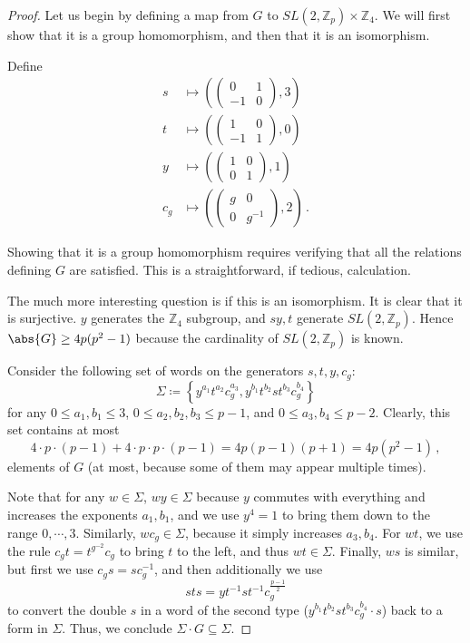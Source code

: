 \documentclass[aps,twocolumn,prx,floatfix,preprintnumbers, nofootinbib,10pt]{revtex4-2}
\numberwithin{equation}{section}
\theoremstyle{definition}
\theoremstyle{remark}
\theoremstyle{claim}
\newcommand{\be}{\begin{equation}}
\newcommand{\ee}{\end{equation}}
\newcommand{\Z}{{\mathbb Z}}
\newcommand{\paren}[1]{\left( #1 \right)}
\newcommand{\curpar}[1]{\left\{ #1 \right\}}
\begin{document}
\begin{proof}
 Let us begin by defining a map from $G$ to $SL(2, \Z_p) \times \Z_4$. We will first show that it is a group homomorphism, and then that it is an isomorphism.

 Define
 \begin{align}
  s &\longmapsto \paren{ \begin{pmatrix} 0 & 1 \\ -1 & 0 \end{pmatrix}, 3 } \nonumber \\
  t &\longmapsto \paren{ \begin{pmatrix} 1 & 0 \\ -1 & 1 \end{pmatrix}, 0 } \nonumber \\
  y &\longmapsto \paren{ \begin{pmatrix} 1 & 0 \\ 0 & 1 \end{pmatrix}, 1 } \nonumber \\
  c_g &\longmapsto \paren{ \begin{pmatrix} g & 0 \\ 0 & g^{-1} \end{pmatrix}, 2 }\,.
 \end{align}

 Showing that it is a group homomorphism requires verifying that all the relations defining $G$ are satisfied. This is a straightforward, if tedious, calculation.

 The much more interesting question is if this is an isomorphism. It is clear that it is surjective. $y$ generates the $\Z_4$ subgroup, and $sy, t$ generate $SL(2, \Z_p)$. Hence $\abs{G} \geq 4 p (p^2 - 1)$ because the cardinality of $SL(2, \Z_p)$ is known.
 
 Consider the following set of words on the generators $s, t, y, c_g$:
 \be
 \Sigma \coloneqq \curpar{y^{a_1} t^{a_2} c_g^{a_3}, y^{b_1} t^{b_2} s t^{b_3} c_g^{b_4}}
 \ee
 for any $0 \leq a_1, b_1 \leq 3$, $0 \leq a_2, b_2, b_3 \leq p - 1$, and $0 \leq a_3, b_4 \leq p - 2$. Clearly, this set contains at most
 \be
 4 \cdot p \cdot (p - 1) + 4 \cdot p \cdot p \cdot (p-1) = 4p (p - 1)(p + 1) = 4 p (p^2 - 1) \,,
 \ee
 elements of $G$ (at most, because some of them may appear multiple times).

 Note that for any $w \in \Sigma$, $wy \in \Sigma$ because $y$ commutes with everything and increases the exponents $a_1, b_1$, and we use $y^4 = 1$ to bring them down to the range $0, \cdots, 3$. Similarly, $w c_g \in \Sigma$, because it simply increases $a_3, b_4$. For $wt$, we use the rule $c_g t = t^{g^{-2}} c_g$ to bring $t$ to the left, and thus $wt \in \Sigma$. Finally, $ws$ is similar, but first we use $c_g s = s c_g^{-1}$, and then additionally we use
 \be
 sts = y t^{-1} s t^{-1} c_g^{\frac{p-1}{2}}
 \ee
 to convert the double $s$ in a word of the second type ($y^{b_1} t^{b_2} s t^{b_3} c_g^{b_4} \cdot s$) back to a form in $\Sigma$. Thus, we conclude $\Sigma \cdot G \subseteq \Sigma$.


\end{proof}
\end{document}
